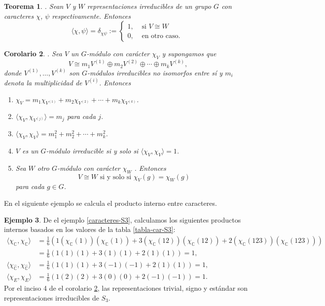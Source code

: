 \documentclass[12pt]{book}
\newtheorem{theorem}{Teorema}[section]
\newtheorem{corollary}[theorem]{Corolario}
\theoremstyle{definition}
\newtheorem{example}[theorem]{Ejemplo}
\newcounter{in}
\begin{document}
\begin{theorem}{}.
  \label{prod-car-irr}
  Sean $V$ y $W$ representaciones irreducibles de un grupo $G$ con
  caracteres $\chi$, $\psi$ respectivamente. Entonces
  \[
  \langle\chi,\psi\rangle=\delta_{\chi\psi}:=
  \begin{cases}
    1, & \text{ si }  V\cong W \\
    0, & \text{ en otro caso. } 
  \end{cases}
  \]
\end{theorem}
\begin{corollary}{}.
  \label{multiplicidad}
  Sea $V$ un $G$-módulo con carácter $\chi_{V}$ y supongamos que 
  \begin{equation*}
    V\cong m_{1}V^{(1)}\oplus m_{2}V^{(2)}\oplus\cdots\oplus
    m_{k}V^{(k)},
  \end{equation*}
donde $V^{(1)},\ldots,V^{(k)}$ son $G$-módulos
irreducibles no isomorfos entre sí y $m_{i}$ denota la multiplicidad
de $V^{(i)}$. Entonces
\begin{enumerate}
\item $\chi_{V}=m_{1}\chi_{V^{(1)}}+m_{2}\chi_{V^{(2)}}+\cdots+m_{k}\chi_{V^{(k)}}$.
\item $\langle\chi_{V},\chi_{V^{(j)}}\rangle=m_{j}$ para cada $j$.
\item $\langle\chi_{V},\chi_{V}\rangle=m_{1}^{2}+m_{2}^{2}+\cdots+m_{k}^{2}$.
\item $V$ es un $G$-módulo irreducible si y solo si $\langle\chi_{V},\chi_{V}\rangle=1$.
\item Sea $W$ otro $G$-módulo con carácter $\chi_{W}$ . Entonces 
  $$V\cong W \mbox{ si y solo si } \chi_{V}(g)=\chi_{W}(g)$$
  para cada $g\in G$.
\end{enumerate}
\end{corollary}

En el siguiente ejemplo se calcula el producto interno entre caracteres.
\begin{example}
  \label{rep-triv-sig-est}
  De el ejemplo \ref{caracteres-S3}, calculamos los siguientes
  productos internos basados en los valores de la tabla \ref{tabla-car-S3}:
  \begin{align*}
    \langle\chi_{\mathbb{C}},\chi_{\mathbb{C}}\rangle&=\frac{1}{6}(1(\chi_{\mathbb{C}}(1))(\chi_{\mathbb{C}}(1))+3(\chi_{\mathbb{C}}(12))(\chi_{\mathbb{C}}(12))+2(\chi_{\mathbb{C}}(123))(\chi_{\mathbb{C}}(123)))\\
    &=\frac{1}{6}(1(1)(1)+3(1)(1)+2(1)(1))=1,  \\
    \langle\chi_{\widehat{\mathbb{C}}},\chi_{\widehat{\mathbb{C}}}\rangle&=\frac{1}{6}(1(1)(1)+3(-1)(-1)+2(1)(1))=1,  \\
    \langle\chi_{E},\chi_{E}\rangle&=\frac{1}{6}(1(2)(2)+3(0)(0)+2(-1)(-1))=1.
  \end{align*}
 Por el inciso 4 de el corolario \ref{multiplicidad}, las representaciones trivial,
 signo y estándar son representaciones irreducibles de $S_{3}$.
\end{example}
\end{document}
